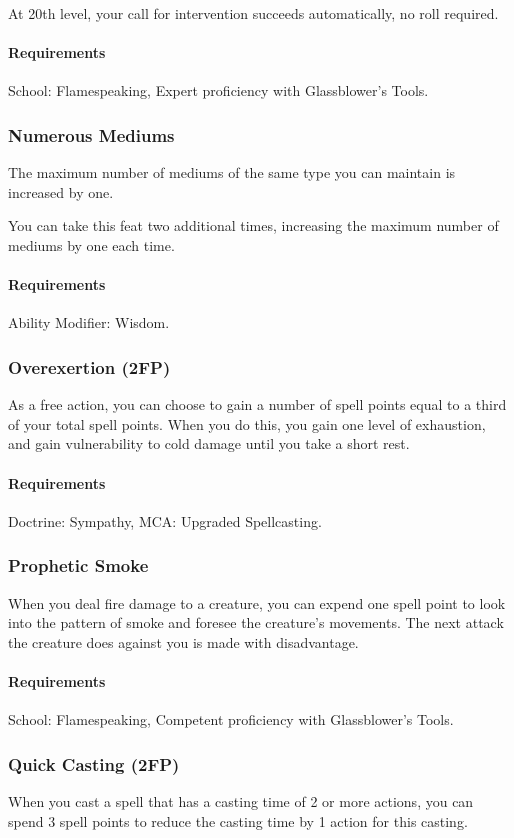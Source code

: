     At 20th level, your call for intervention succeeds automatically, no roll required.
    \paragraph{Requirements} School: Flamespeaking, Expert proficiency with Glassblower's Tools.
\subsubsection{Numerous Mediums} \label{feat::numerousmediums}
    The maximum number of mediums of the same type you can maintain is increased by one.

    You can take this feat two additional times, increasing the maximum number of mediums by one each time.
    \paragraph{Requirements} Ability Modifier: Wisdom.
\subsubsection{Overexertion (2FP)} \label{feat::overexertion}
    As a free action, you can choose to gain a number of spell points equal to a third of your total spell points.
    When you do this, you gain one level of exhaustion, and gain vulnerability to cold damage until you take a short rest.
    \paragraph{Requirements} Doctrine: Sympathy, MCA: Upgraded Spellcasting.
\subsubsection{Prophetic Smoke} \label{feat::propheticsmoke}
    When you deal fire damage to a creature, you can expend one spell point to look into the pattern of smoke and foresee the creature's movements.
    The next attack the creature does against you is made with disadvantage.
    \paragraph{Requirements} School: Flamespeaking, Competent proficiency with Glassblower's Tools.
\subsubsection{Quick Casting (2FP)} \label{feat::quickcasting}
    When you cast a spell that has a casting time of 2 or more actions, you can spend 3 spell points to reduce the casting time by 1 action for this casting.
